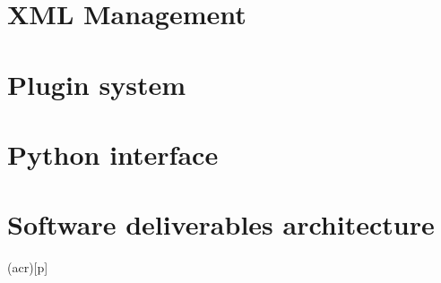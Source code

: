 \documentclass[a4paper,twoside,openright,makeidx,12pt]{book}
\begin{document}
\newpage
\chapter{XML Management}
\label{Sec:DDD-XMLManagement}



\newpage
\chapter{Plugin system}
\label{Sec:DDD-Pluginsystem}


\newpage
\chapter{Python interface}
\label{Sec:DDD-pyInterface}

%


\newpage
\chapter{Software deliverables architecture}
\label{Sec:DDD-SoftwareDeliverablesArchitecture}



%


\newpage


\printglosstex(acr)[p]


\cleardoublepage
%
%
\end{document}

